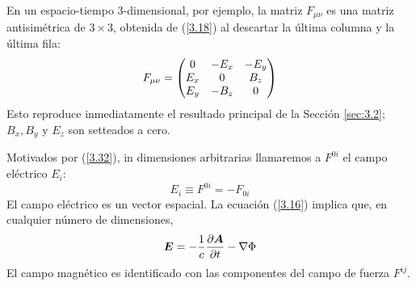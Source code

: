 En un espacio-tiempo 3-dimensional, por ejemplo, la matriz $F_{\mu\nu}$ es una matriz antisimétrica de $3\times 3$, obtenida de (\ref{3.18}) al descartar la última columna y la última fila:
\begin{equation}\label{3.35}
    F_{\mu\nu}=\mqty(0&-E_x&-E_y\\E_x&0&B_z\\E_y&-B_z&0)
\end{equation}
Esto reproduce inmediatamente el resultado principal de la Sección \ref{sec:3.2}; $B_x,B_y$ y $E_z$ son setteados a cero. 

Motivados por (\ref{3.32}), in dimensiones arbitrarias llamaremos a $F^{0i}$ el campo eléctrico $E_i$:
\begin{equation}\label{3.36}
    E_i\equiv F^{0i}=-F_{0i}
\end{equation}
El campo eléctrico es un vector espacial. La ecuación (\ref{3.16}) implica que, en cualquier número de dimensiones,
\begin{equation}\label{3.37}
    \vb*{E}=-\frac{1}{c}\pdv{\vb*{A}}{t}-\nabla\Phi
\end{equation}
El campo magnético es identificado con las componentes del campo de fuerza $F^{ij}$.


